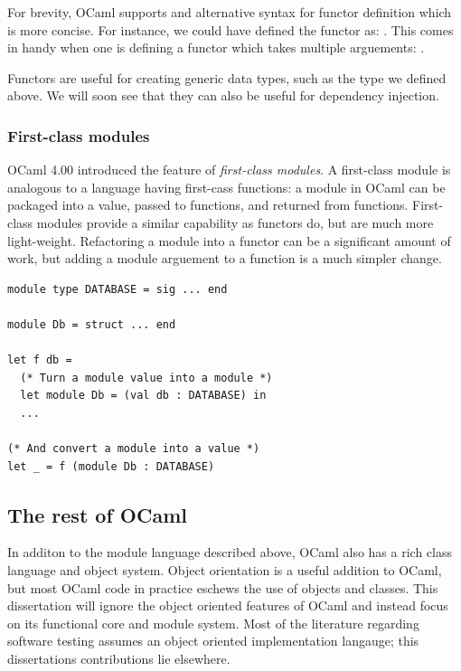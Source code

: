 For brevity, OCaml supports and alternative syntax for functor
definition which is more concise. For instance, we could have defined
the  functor as:
.
This comes in handy when one is defining a functor which takes
multiple arguements:
 .

Functors are useful for creating generic data types, such as the
 type we defined above. We will soon see that they can also
be useful for dependency injection.

\subsubsection{First-class modules}

OCaml 4.00 introduced the feature of \textit{first-class modules}. A
first-class module is analogous to a language having first-cass
functions: a module in OCaml can be packaged into a value, passed to
functions, and returned from functions. First-class modules provide a
similar capability as functors do, but are much more
light-weight. Refactoring a module into a functor can be a significant
amount of work, but adding a module arguement to a function is a much
simpler change.

\begin{lstlisting}
module type DATABASE = sig ... end

module Db = struct ... end

let f db =
  (* Turn a module value into a module *)
  let module Db = (val db : DATABASE) in
  ...

(* And convert a module into a value *)
let _ = f (module Db : DATABASE)
\end{lstlisting}

\subsection{The rest of OCaml}


In additon to the module language described above, OCaml also has a
rich class language and object system. Object orientation is a useful
addition to OCaml, but most OCaml code in practice eschews the use of
objects and classes. This dissertation will ignore the object oriented
features of OCaml and instead focus on its functional core and module
system. Most of the literature regarding software testing assumes
an object oriented implementation langauge; this dissertations
contributions lie elsewhere.

